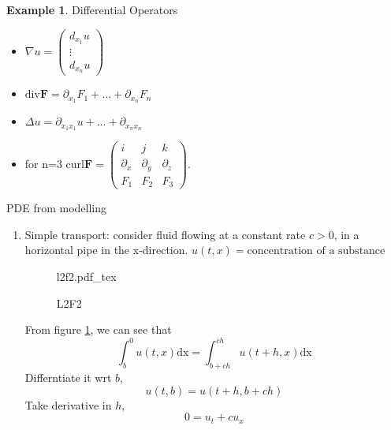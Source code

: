 \documentclass[a4paper]{article}
\newcommand{\incfig}[1]{%
	\def\svgwidth{\columnwidth}
	{#1.pdf_tex}
}
\theoremstyle{definition}
\newtheorem{example}{Example}
\begin{document}
\begin{example}
	Differential Operators
	\begin{itemize}
		\item 
	$\nabla u=\begin{pmatrix} d_{x_1}u \\ \vdots \\d_{x_n}u \end{pmatrix} $
\item
	$\text{div} \mathbf{F}=\partial_{x_1}F_1+ \ldots +\partial_{x_n}F_n$
\item
	$\Delta u=\partial_{x_1x_1}u+\ldots+\partial_{x_nx_n}$
\item
	for n=3 $\text{curl} \mathbf{F}=\begin{pmatrix} i&j&k\\\partial_x&\partial_y&\partial_z\\F_1&F_2&F_3 \end{pmatrix}$. 
	\end{itemize}
	PDE from modelling 
	\begin{enumerate}
		\item Simple transport: consider fluid flowing at a constant rate $c>0$, in a horizontal pipe in the x-direction. $u\left( t,x \right) =\text{concentration of a substance}$
\begin{figure}[H]
    \centering
    \incfig{l2f2}
    \caption{L2F2}
    \label{fig:l2f2}
\end{figure}
From figure \ref{fig:l2f2}, we can see that 
\begin{equation}
	\int_{b}^{0} u\left( t,x \right) \text{dx}=\int_{b+ch}^{ch} u\left( t+h,x \right) \text{dx}  
\end{equation} 
Differntiate it wrt $b$, 
\begin{equation}
	u\left( t,b \right) =u\left( t+h,b+ch \right) 
\end{equation} 
Take derivative in $h$, 
\begin{equation}
	0=u_t+cu_x
\end{equation} 
	\end{enumerate}
\end{example}
\end{document}
